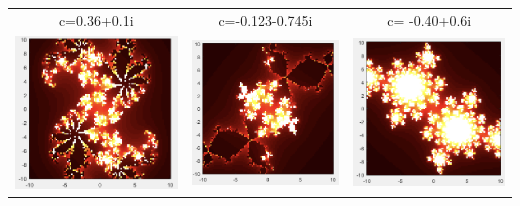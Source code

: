 \documentclass[11pt]{article}
\theoremstyle{plain}
\theoremstyle{definition}
\begin{document}
\begin{tabular}{c c c}
	c=0.36+0.1i                                  &c=-0.123-0.745i                         &c= -0.40+0.6i\\
	\includegraphics*[scale = 0.3]{Plot6.png} 
	& \includegraphics*[scale = 0.3]{Plot7.png} 
	&\includegraphics*[scale = 0.3]{Plot8.png} 
\end{tabular}
\end{document}
